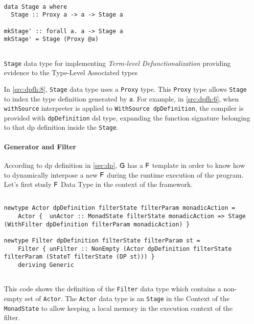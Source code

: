 \begin{listing}[H]
  \begin{verbatim}

data Stage a where
  Stage :: Proxy a -> a -> Stage a

mkStage' :: forall a. a -> Stage a
mkStage' = Stage (Proxy @a)
    
  \end{verbatim}
  \caption[{[\texttt{Stage.hs}] Stage Data Type}]{\texttt{Stage} data type for implementing \emph{Term-level Defunctionalization} providing evidence to the Type-Level Associated types}
  \label{src:dpfh:8}
\end{listing}

In \autoref{src:dpfh:8}, \texttt{Stage} data type uses a \texttt{Proxy} type. 
This \texttt{Proxy} type allows \texttt{Stage} to index the type definition generated by \texttt{a}.
For example, in \autoref{src:dpfh:6}, when \texttt{withSource} interpreter is applied to \texttt{WithSource dpDefinition},  
the compiler is provided with \texttt{dpDefinition} \acrshort{dsl} type, expanding the function signature belonging to that \acrshort{dp} definition inside the \texttt{Stage}.

\paragraph{Generator and Filter}
According to \acrshort{dp} definition in \autoref{sec:dp}, $\mathsf{G}$ has a $\mathsf{F}$ template in order to know how to dynamically interpose a new $\mathsf{F}$ during the runtime execution of the program.
Let's first study $\mathsf{F}$ Data Type in the context of the framework.

\begin{listing}[H]
  \begin{verbatim}

newtype Actor dpDefinition filterState filterParam monadicAction =
    Actor {  unActor :: MonadState filterState monadicAction => Stage (WithFilter dpDefinition filterParam monadicAction) }

newtype Filter dpDefinition filterState filterParam st =
    Filter { unFilter :: NonEmpty (Actor dpDefinition filterState filterParam (StateT filterState (DP st))) }
    deriving Generic
    
  \end{verbatim}
  \caption[{[\texttt{Stage.hs}] Filter / Actor Data Type}]{This code shows the definition of the \texttt{Filter} data type which contains a non-empty set of \texttt{Actor}. The \texttt{Actor} data type is an \texttt{Stage} in the Context of the \texttt{MonadState} to allow keeping a local memory in the execution context of the filter.}
  \label{src:dpfh:9}
\end{listing}

